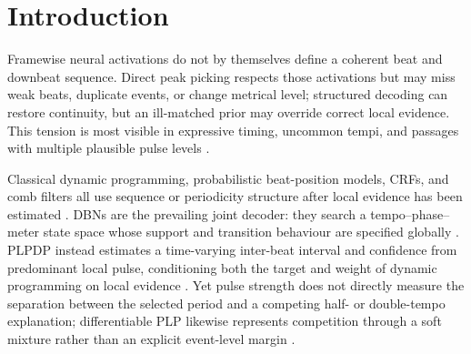 \documentclass{article}
\begin{document}

\section{Introduction}
\label{sec:intro}
Framewise neural activations do not by themselves define a coherent beat and
downbeat sequence. Direct peak picking respects those activations but may miss
weak beats, duplicate events, or change metrical level; structured decoding can
restore continuity, but an ill-matched prior may override correct local
evidence. This tension is most visible in expressive timing, uncommon tempi,
and passages with multiple plausible pulse levels
\cite{chiu2023localperiodicity,foscarin2024beat,ahn2026smcblindspot}.

Classical dynamic programming, probabilistic beat-position models, CRFs, and
comb filters all use sequence or periodicity structure after local evidence has
been estimated \cite{ellis2007beattracking,korzeniowski2014crf,fillon2015crf,
bock2015combfilter}. DBNs are the prevailing joint decoder: they search a
tempo--phase--meter state space whose support and transition behaviour are
specified globally \cite{krebs2015dbn,bock2016joint}. PLPDP instead estimates a
time-varying inter-beat interval and confidence from predominant local pulse,
conditioning both the target and weight of dynamic programming on local
evidence \cite{chiu2023localperiodicity}. Yet pulse strength does not directly
measure the separation between the selected period and a competing half- or
double-tempo explanation; differentiable PLP likewise represents competition
through a soft mixture rather than an explicit event-level margin
\cite{chiu2025dplp}.
\end{document}
